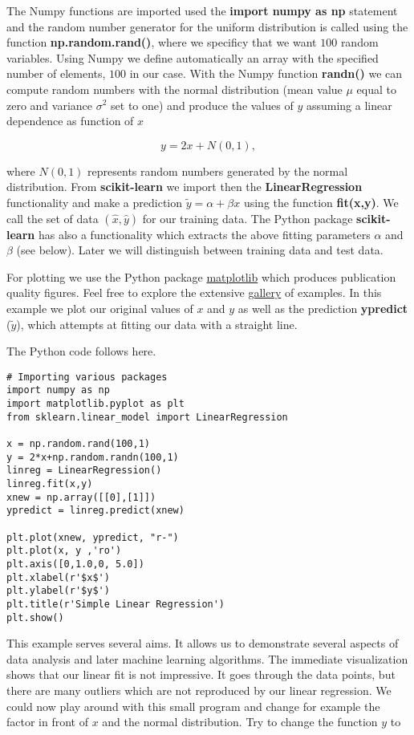 \documentclass[%
oneside,                 %
final,                   %
10pt]{article}
\begin{document}
The Numpy functions are imported used the \textbf{import numpy as np}
statement and the random number generator for the uniform distribution
is called using the function \textbf{np.random.rand()}, where we specificy
that we want $100$ random variables.  Using Numpy we define
automatically an array with the specified number of elements, $100$ in
our case.  With the Numpy function \textbf{randn()} we can compute random
numbers with the normal distribution (mean value $\mu$ equal to zero and
variance $\sigma^2$ set to one) and produce the values of $y$ assuming a linear
dependence as function of $x$

\[
y = 2x+N(0,1),
\]

where $N(0,1)$ represents random numbers generated by the normal
distribution.  From \textbf{scikit-learn} we import then the
\textbf{LinearRegression} functionality and make a prediction $\tilde{y} =
\alpha + \beta x$ using the function \textbf{fit(x,y)}. We call the set of
data $(\hat{x},\hat{y})$ for our training data. The Python package
\textbf{scikit-learn} has also a functionality which extracts the above
fitting parameters $\alpha$ and $\beta$ (see below). Later we will
distinguish between training data and test data.

For plotting we use the Python package
\href{{https://matplotlib.org/}}{matplotlib} which produces publication
quality figures. Feel free to explore the extensive
\href{{https://matplotlib.org/gallery/index.html}}{gallery} of examples. In
this example we plot our original values of $x$ and $y$ as well as the
prediction \textbf{ypredict} ($\tilde{y}$), which attempts at fitting our
data with a straight line.

The Python code follows here.
\begin{verbatim}
# Importing various packages
import numpy as np
import matplotlib.pyplot as plt
from sklearn.linear_model import LinearRegression

x = np.random.rand(100,1)
y = 2*x+np.random.randn(100,1)
linreg = LinearRegression()
linreg.fit(x,y)
xnew = np.array([[0],[1]])
ypredict = linreg.predict(xnew)

plt.plot(xnew, ypredict, "r-")
plt.plot(x, y ,'ro')
plt.axis([0,1.0,0, 5.0])
plt.xlabel(r'$x$')
plt.ylabel(r'$y$')
plt.title(r'Simple Linear Regression')
plt.show()
\end{verbatim}

This example serves several aims. It allows us to demonstrate several
aspects of data analysis and later machine learning algorithms. The
immediate visualization shows that our linear fit is not
impressive. It goes through the data points, but there are many
outliers which are not reproduced by our linear regression.  We could
now play around with this small program and change for example the
factor in front of $x$ and the normal distribution.  Try to change the
function $y$ to
\end{document}
